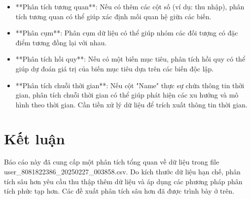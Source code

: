 \documentclass[12pt]{article}
\begin{document}
\begin{itemize}
    \item **Phân tích tương quan**: Nếu có thêm các cột số (ví dụ: thu nhập), phân tích tương quan có thể giúp xác định mối quan hệ giữa các biến.
    \item **Phân cụm**: Phân cụm dữ liệu có thể giúp nhóm các đối tượng có đặc điểm tương đồng lại với nhau.
    \item **Phân tích hồi quy**: Nếu có một biến mục tiêu, phân tích hồi quy có thể giúp dự đoán giá trị của biến mục tiêu dựa trên các biến độc lập.
    \item **Phân tích chuỗi thời gian**: Nếu cột "Name" thực sự chứa thông tin thời gian, phân tích chuỗi thời gian có thể giúp phát hiện các xu hướng và mô hình theo thời gian. Cần tiền xử lý dữ liệu để trích xuất thông tin thời gian.
\end{itemize}

\section{Kết luận}

Báo cáo này đã cung cấp một phân tích tổng quan về dữ liệu trong file user\_8081822386\_20250227\_003858.csv. Do kích thước dữ liệu hạn chế, phân tích sâu hơn yêu cầu thu thập thêm dữ liệu và áp dụng các phương pháp phân tích phức tạp hơn. Các đề xuất phân tích sâu hơn đã được trình bày ở trên.
\end{document}

